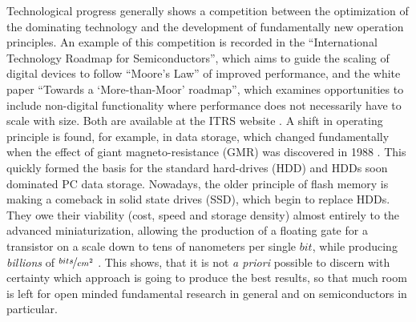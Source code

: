 



Technological progress generally shows a competition between the optimization of the dominating technology and the development of fundamentally new operation principles. An example of this competition is recorded in the ``International Technology Roadmap for Semiconductors'', which aims to guide the scaling of digital devices to follow ``Moore's Law'' of improved performance, and the white paper ``Towards a `More-than-Moor' roadmap'', which examines opportunities to include non-digital functionality where performance does not necessarily have to scale with size. Both are available at the ITRS website  \cite{map_http://www.itrs.net/_2015}. A shift in operating principle is found, for example, in data storage, which changed fundamentally when the effect of giant magneto-resistance (GMR) was discovered in 1988 \cite{baibich_giant_1988,binasch_enhanced_1989}. This quickly formed the basis for the standard hard-drives (HDD) and HDDs soon dominated PC data storage. Nowadays, the older principle of flash memory is making a comeback in solid state drives (SSD), which begin to replace HDDs. They owe their viability (cost, speed and storage density) almost entirely to the advanced miniaturization, allowing the production of a floating gate for a transistor on a scale down to tens of nanometers per single $bit$, while producing \emph{billions} of $\nicefrac{bits}{cm^{2}}$ \cite{micheloni_inside_2013}. This shows, that it is not \emph{a priori} possible to discern with certainty which approach is going to produce the best results, so that much room is left for open minded fundamental research in general and on semiconductors in particular.

